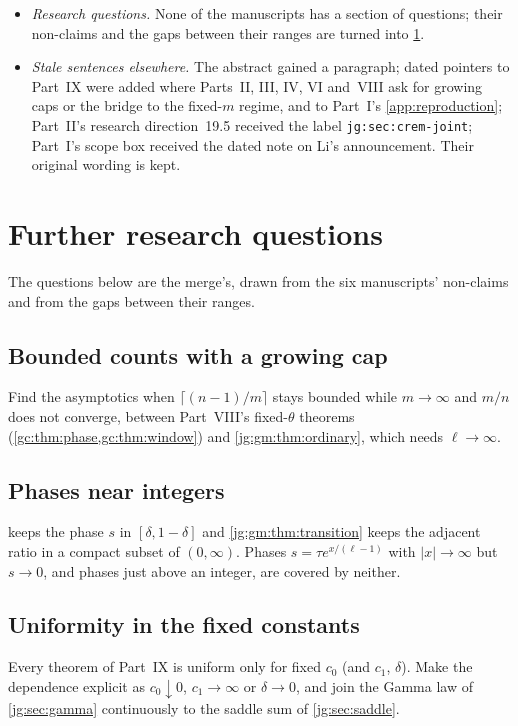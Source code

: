 \documentclass[11pt,a4paper]{article}
\theoremstyle{definition}\newaliascnt{definition}{theorem}
\theoremstyle{remark}\newaliascnt{remark}{theorem}
\begin{document}
\begin{itemize}
 duplicates printed once, and of displays that restate this report, are
 replaced by the printed label; the report's README lists them.
\item \emph{Research questions.} None of the manuscripts has a section of
 questions; their non-claims and the gaps between their ranges are turned into
 \cref{jg:sec:research}.
\item \emph{Stale sentences elsewhere.} The abstract gained a paragraph; dated
 pointers to Part~IX were added where Parts~II, III, IV, VI and~VIII ask for
 growing caps or the bridge to the fixed-$m$ regime, and to Part~I's
 \cref{app:reproduction}; Part~II's research direction~19.5 received the label
 \texttt{jg:sec:crem-joint}; Part~I's scope box received the dated note on
 Li's announcement. Their original wording is kept.
\end{itemize}

\section{Further research questions}
\label{jg:sec:research}
The questions below are the merge's, drawn from the six manuscripts'
non-claims and from the gaps between their ranges.

\subsection{Bounded counts with a growing cap}
\label{jg:sec:q-bounded}
Find the asymptotics when $\lceil(n-1)/m\rceil$ stays bounded while
$m\to\infty$ and $m/n$ does not converge, between Part~VIII's fixed-$\theta$
theorems (\cref{gc:thm:phase,gc:thm:window}) and
\cref{jg:gm:thm:ordinary}, which needs $\ell\to\infty$.

\subsection{Phases near integers}
\label{jg:sec:q-phases}
 keeps the phase $s$ in $[\delta,1-\delta]$ and
\cref{jg:gm:thm:transition} keeps the adjacent ratio in a compact subset of
$(0,\infty)$. Phases $s=\tau e^{x/(\ell-1)}$ with $|x|\to\infty$ but $s\to0$, and
phases just above an integer, are covered by neither.

\subsection{Uniformity in the fixed constants}
\label{jg:sec:q-uniform}
Every theorem of Part~IX is uniform only for fixed $c_0$ (and $c_1$, $\delta$).
Make the dependence explicit as $c_0\downarrow0$, $c_1\to\infty$ or
$\delta\to0$, and join the Gamma law of \cref{jg:sec:gamma} continuously to the
saddle sum of \cref{jg:sec:saddle}.
\end{document}
